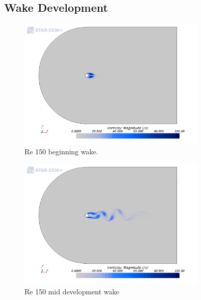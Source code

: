 \documentclass[10pt,english]{article}
\begin{document}
\FloatBarrier
\subsection{Wake Development}

\vspace{-5pt}

 \begin{figure}[h]
\centering
\includegraphics[trim={0.5cm 1.5cm 0.5cm .6cm},clip,width=0.8\textwidth]{start}
\vspace{-5pt}
\caption{Re 150 beginning wake.}
\label{f:start}
\end{figure}

\vspace{-5pt}

 \begin{figure}[h]
\centering
\includegraphics[trim={0.5cm 1.5cm 0.5cm .6cm},clip,width=0.8\textwidth]{mid}
\vspace{-5pt}
\caption{Re 150 mid development wake}
\label{f:mid}
\end{figure}

\vspace{-5pt}
\end{document}
